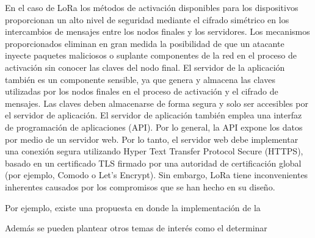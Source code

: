 En el caso de LoRa los métodos de activación disponibles para los dispositivos proporcionan un alto nivel de seguridad mediante el cifrado simétrico en los intercambios de mensajes entre los nodos finales y los servidores. Los mecanismos proporcionados eliminan en gran medida la posibilidad de que un atacante inyecte paquetes maliciosos o suplante componentes de la red en el proceso de activación sin conocer las claves del nodo final. El servidor de la aplicación también es un componente sensible, ya que genera y almacena las claves utilizadas por los nodos finales en el proceso de activación y el cifrado de mensajes. Las claves deben almacenarse de forma segura y solo ser accesibles por el servidor de aplicación. El servidor de aplicación también emplea una interfaz de programación de aplicaciones (API). Por lo general, la API expone los datos por medio de un servidor web. Por lo tanto, el servidor web debe implementar una conexión segura utilizando Hyper Text Transfer Protocol Secure (HTTPS), basado en un certificado TLS firmado por una autoridad de certificación global (por ejemplo, Comodo o Let's Encrypt)\cite{Oniga2017AArchitecture}. Sin embargo, LoRa tiene inconvenientes inherentes causados por los compromisos que se han hecho en su diseño.


Por ejemplo, existe una propuesta en donde la implementación de la %

Además se pueden plantear otros temas de interés como el determinar %
